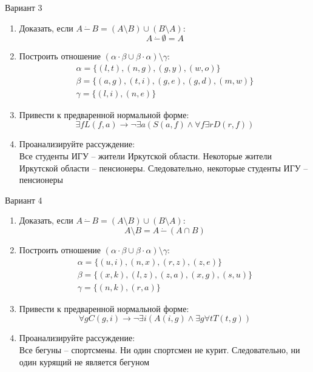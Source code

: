 \documentclass[10pt,a4paper]{article}
\begin{document}
\begin{multicols}{2}
Вариант 3
\begin{enumerate}
\item Доказать, если $A\,\dot{-}\,B=(A\setminus B)\cup(B\setminus A)$: \\
$$A\,\dot{-}\,\emptyset=A$$
\item Построить отношение $(\alpha\cdot\beta\cup\beta\cdot\alpha)\setminus\gamma$:
$$\begin{array}{l} \alpha=\{ (l, t), (n, g), (g, y), (w, o) \} \\ \beta=\{ (a, g), (t, i), (g, e), (g, d), (m, w) \} \\ \gamma=\{ (l, i), (n, e) \} \end{array}$$
\item Привести к предваренной нормальной форме: \:\\
$$\exists fL(f,a) \to \neg \exists a( S(a,f) \wedge \forall f\exists r D(r, f))$$
\item Проанализируйте рассуждение: \:\\
Все студенты ИГУ -- жители Иркутской области. Некоторые жители Иркутской области -- пенсионеры. Следовательно, некоторые студенты ИГУ -- пенсионеры
\end{enumerate}
Вариант 4
\begin{enumerate}
\item Доказать, если $A\,\dot{-}\,B=(A\setminus B)\cup(B\setminus A)$: \\
$$A\setminus B = A\,\dot{-}\,(A\cap B)$$
\item Построить отношение $(\alpha\cdot\beta\cup\beta\cdot\alpha)\setminus\gamma$:
$$\begin{array}{l} \alpha=\{ (u, i), (n, x), (r, z), (z, e) \} \\ \beta=\{ (x, k), (l, z), (z, a), (x, g), (s, u) \} \\ \gamma=\{ (n, k), (r, a) \} \end{array}$$
\item Привести к предваренной нормальной форме: \:\\
$$\forall gC(g,i) \to \neg \exists i( A(i,g) \wedge \exists g\forall t T(t, g))$$
\item Проанализируйте рассуждение: \:\\
Все бегуны -- спортсмены. Ни один спортсмен не курит. Следовательно, ни один курящий не является бегуном
\end{enumerate}

\end{multicols}
\end{document}
